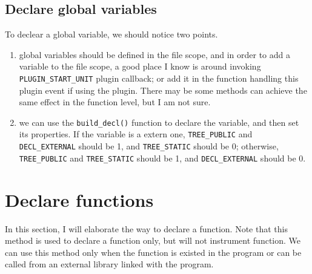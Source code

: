 \documentclass[11pt]{article}
\begin{document}
\subsection{Declare global variables}
To declear a global variable, we should notice two points.
\begin{enumerate}
\item global variables should be defined in the file scope, and in order to add a variable to the file scope, a good place I know is around invoking \texttt{PLUGIN\_START\_UNIT} plugin callback; or add it in the function handling this plugin event if using the plugin. There may be some methods can achieve the same effect in the function level, but I am not sure.  
\item we can use the \texttt{build\_decl()} function to declare the variable, and then set its properties. If the variable is a extern one, \texttt{TREE\_PUBLIC} and \texttt{DECL\_EXTERNAL} should be 1, and \texttt{TREE\_STATIC} should be 0; otherwise, \texttt{TREE\_PUBLIC} and \texttt{TREE\_STATIC} should be 1, and \texttt{DECL\_EXTERNAL} should be 0.
\end{enumerate}

\pagebreak

\section{Declare functions}
In this section, I will elaborate the way to declare a function. Note that this method is used to declare a function only, but will not instrument function. We can use this method only when the function is existed in the program or can be called from an external library linked with the program.
\end{document}
